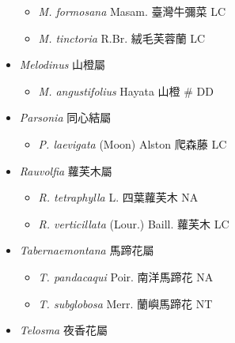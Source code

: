 \begin{itemize}
  \begin{itemize}
        \item[] \textit{M. formosana} Masam.  臺灣牛彌菜   LC
        \item[] \textit{M. tinctoria} R.Br.  絨毛芙蓉蘭   LC
  \end{itemize}
 \item[] \textit{Melodinus} 山橙屬
                                
  \begin{itemize}
        \item[] \textit{M. angustifolius} Hayata  山橙  \# DD
  \end{itemize}
 \item[] \textit{Parsonia} 同心結屬
                                
  \begin{itemize}
        \item[] \textit{P. laevigata} (Moon) Alston  爬森藤   LC
  \end{itemize}
 \item[] \textit{Rauvolfia} 蘿芙木屬
                                
  \begin{itemize}
        \item[] \textit{R. tetraphylla} L.  四葉蘿芙木   NA
        \item[] \textit{R. verticillata} (Lour.) Baill.  蘿芙木   LC
  \end{itemize}
 \item[] \textit{Tabernaemontana} 馬蹄花屬
                                
  \begin{itemize}
        \item[] \textit{T. pandacaqui} Poir.  南洋馬蹄花   NA
        \item[] \textit{T. subglobosa} Merr.  蘭嶼馬蹄花   NT
  \end{itemize}
 \item[] \textit{Telosma} 夜香花屬
                                

\end{itemize}
